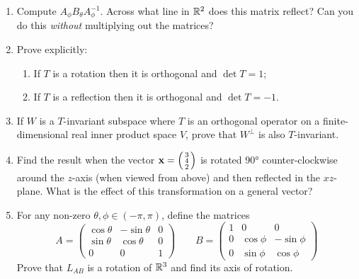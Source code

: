 \begin{exercises}
\begin{enumerate}
 	\item Compute $A_\phi B_\theta A_\phi^{-1}$. Across what line in $\mathbb{R}^2$ does this matrix reflect? Can you do this \emph{without} multiplying out the matrices?
  
  \item Prove explicitly:
  \begin{enumerate}
    \item If $T$ is a rotation then it is orthogonal and $\det T=1$;
    \item If $T$ is a reflection then it is orthogonal and $\det T=-1$.
  \end{enumerate}
  
  \item If $W$ is a $T$-invariant subspace where $T$ is an orthogonal operator on a finite-dimensional real inner product space $V$, prove that $W^\perp$ is also $T$-invariant.

	\item Find the result when the vector ${\mathbf{x}}=\left(\begin{smallmatrix}3\\4\\2\end{smallmatrix}\right)$ is rotated \ang{90} counter-clockwise around the $z$-axis (when viewed from above) and then reflected in the $xz$-plane. What is the effect of this transformation on a general vector?
  
  \item For any non-zero $\theta,\phi\in(-\pi,\pi)$, define the matrices
  \[A=\begin{pmatrix}
  \cos\theta&-\sin\theta&0\\
  \sin\theta&\cos\theta&0\\
  0&0&1
  \end{pmatrix}\qquad B=\begin{pmatrix}
  1&0&0\\
  0&\cos\phi&-\sin\phi\\
  0&\sin\phi&\cos\phi
  \end{pmatrix}\]
  Prove that $L_{AB}$ is a rotation of $\mathbb{R}^3$ and find its axis of rotation.

 	
  
%  
%   
	

\end{enumerate}
\end{exercises}
